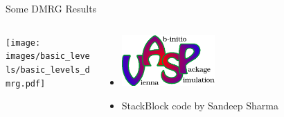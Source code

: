 
\begin{frame}{Some DMRG\: Results} %
    \begin{columns}
    \begin{column}{0.5\textwidth}
      \texttt{[image: images/basic\_levels/basic\_levels\_dmrg.pdf]}
    \end{column}
    \begin{column}{0.5\textwidth}
      \begin{itemize}
        \item[]
          \includegraphics[width=0.4\textwidth]{images/vasp_logo.eps}
        \item[]
          {\sc StackBlock code by Sandeep Sharma}
      \end{itemize}
    \end{column}
  \end{columns}
\end{frame}



